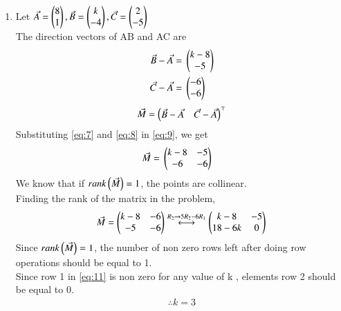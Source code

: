 \documentclass[journal,12pt,twocolumn]{IEEEtran}
\begin{document}
\begin{enumerate}
\item Let $\Vec{A}=\begin{pmatrix}8\\1\end{pmatrix}, \Vec{B}=\begin{pmatrix}k \\ -4\end{pmatrix}, \Vec{C}=\begin{pmatrix}2 \\ -5\end{pmatrix}$\\
The direction vectors of AB and AC are
\begin{align}
\label{eq:7}
\Vec{B} - \Vec{A} ={}& \begin{pmatrix}k-8\\-5\end{pmatrix}\\
\label{eq:8}
\Vec{C} - \Vec{A} ={}& \begin{pmatrix}-6 \\ -6\end{pmatrix}
\end{align}
\begin{align}
\label{eq:9}
\Vec{M} =\begin{pmatrix}\Vec{B}-\Vec{A} & \Vec{C}-\Vec{A}\end{pmatrix}^\top
\end{align}
Substituting \eqref{eq:7} and \eqref{eq:8} in \eqref{eq:9}, we get
\begin{align}
\label{eq:10}
\Vec{M}={}&\begin{pmatrix}k-8 & -5 \\ -6 & -6\end{pmatrix}
\end{align}
We know that if $rank\left(\Vec{M}\right)=1$, the points are collinear.\\
Finding the rank of the matrix in the problem,
\begin{align}
\label{eq:11}
\Vec{M} = \begin{pmatrix}k-8 & -6 \\ -5 & -6\end{pmatrix} \overset{R_{2}\rightarrow 5R_{2}-6R_{1}}{\longleftrightarrow} \begin{pmatrix}k-8 & -5 \\ 18-6k & 0\end{pmatrix}
\end{align}
Since $rank\left(\Vec{M}\right)=1$, the number of non zero rows left after doing row operations should be equal to 1.\\
Since row 1 in \eqref{eq:11} is non zero for any value of k , elements row 2 should be equal to 0.
\begin{align}
\therefore k=3
\end{align}

\end{enumerate}
\end{document}

